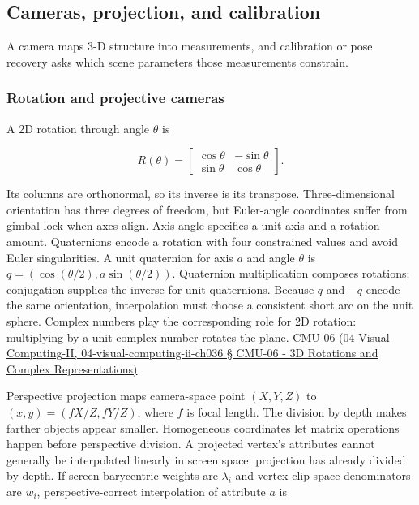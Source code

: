 \subsection{Cameras, projection, and calibration}\label{cameras-projection-and-calibration}

A camera maps 3-D structure into measurements, and calibration or pose recovery asks which scene parameters those measurements constrain.

\subsubsection{Rotation and projective cameras}\label{rotation-and-projective-cameras}

A 2D rotation through angle \(\theta\) is

\[
R(\theta)=\begin{bmatrix}\cos\theta&-\sin\theta\\\sin\theta&\cos\theta\end{bmatrix}.
\]

Its columns are orthonormal, so its inverse is its transpose. Three-dimensional orientation has three degrees of freedom, but Euler-angle coordinates suffer from gimbal lock when axes align. Axis-angle specifies a unit axis and a rotation amount. Quaternions encode a rotation with four constrained values and avoid Euler singularities. A unit quaternion for axis \(a\) and angle \(\theta\) is \(q=(\cos(\theta/2),a\sin(\theta/2))\). Quaternion multiplication composes rotations; conjugation supplies the inverse for unit quaternions. Because \(q\) and \(-q\) encode the same orientation, interpolation must choose a consistent short arc on the unit sphere. Complex numbers play the corresponding role for 2D rotation: multiplying by a unit complex number rotates the plane. \href{}{CMU-06 (04-Visual-Computing-II, 04-visual-computing-ii-ch036 § CMU-06 - 3D Rotations and Complex Representations)}

Perspective projection maps camera-space point \((X,Y,Z)\) to \((x,y)=(fX/Z,fY/Z)\), where \(f\) is focal length. The division by depth makes farther objects appear smaller. Homogeneous coordinates let matrix operations happen before perspective division. A projected vertex's attributes cannot generally be interpolated linearly in screen space: projection has already divided by depth. If screen barycentric weights are \(\lambda_i\) and vertex clip-space denominators are \(w_i\), perspective-correct interpolation of attribute \(a\) is

